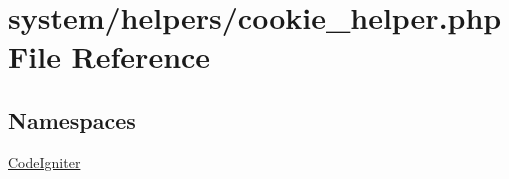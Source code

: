 \hypertarget{cookie__helper_8php}{}\section{system/helpers/cookie\+\_\+helper.php File Reference}
\label{cookie__helper_8php}
\subsection*{Namespaces}
\begin{DoxyCompactItemize}
\item 
 \mbox{\hyperlink{namespace_code_igniter}{Code\+Igniter}}
\end{DoxyCompactItemize}
